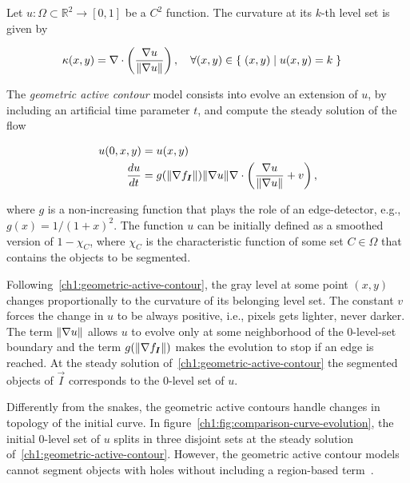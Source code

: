 Let $u:\Omega \subset \mathbb{R}^2 \rightarrow [0,1]$ be a $C^2$ function. The curvature at its $k$-th level set is given by

\begin{align*}
	\kappa (x,y) &= \nabla \cdot \left( \frac{\nabla u}{\lVert\nabla u\rVert} \right), \quad \forall (x,y) \in \left\{ \; (x,y) \; | \; u(x,y)=k \; \right\}
\end{align*}


The \emph{geometric active contour} model consists into evolve an extension of $u$, by including an artificial time parameter $t$, and compute the steady solution of the flow

\begin{align}
	u(0,x,y) &= u(x,y) \nonumber \\
	\frac{du}{dt} &= g( \lVert\nabla f_{\bm{I}}\rVert )\lVert\nabla u\rVert\nabla \cdot \left( \frac{\nabla u}{\lVert\nabla u\rVert}  + v \right),
	\label{ch1:geometric-active-contour}
\end{align}

where $g$ is a non-increasing function that plays the role of an edge-detector, e.g., $g(x) = 1/(1+x)^2$. The function $u$ can be initially defined as a smoothed version of $1 - \chi_C$, where $\chi_C$ is the characteristic function of some set $C \in \Omega $ that contains the objects to be segmented. 

Following~\cref{ch1:geometric-active-contour}, the gray level at some point $(x,y)$ changes proportionally to the curvature of its belonging level set. The constant $v$ forces the change in $u$ to be always positive, i.e., pixels gets lighter, never darker. The term $\lVert\nabla u\rVert$ allows $u$ to evolve only at some neighborhood of the $0$-level-set boundary and the term $g(\lVert\nabla f_{\bm{I}}\rVert)$ makes the evolution to stop if an edge is reached. At the steady solution of~\cref{ch1:geometric-active-contour} the segmented objects of $\vec{I}$ corresponds to the $0$-level set of $u$.

Differently from the snakes, the geometric active contours handle changes in topology of the initial curve. In figure~\cref{ch1:fig:comparison-curve-evolution}, the initial $0$-level set of $u$ splits in three disjoint sets at the steady solution of~\cref{ch1:geometric-active-contour}. However, the geometric active contour models cannot segment objects with holes without including a region-based term~\cite{chen06}.


